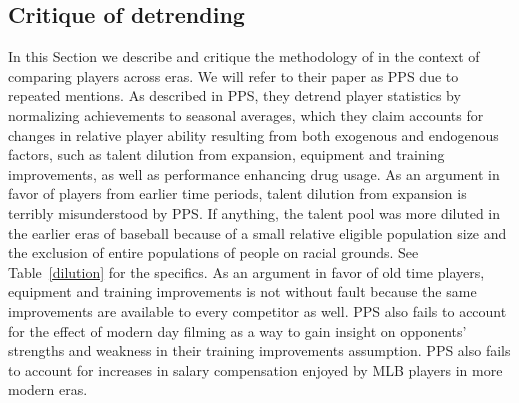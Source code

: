 \documentclass[11pt]{article}\usepackage[]{graphicx}\usepackage[]{color}
\begin{document}


\subsection{Critique of detrending}
In this Section we describe and critique the methodology of \citet{petersen} 
in the context of comparing players across eras.  We will refer to their 
paper as PPS due to repeated mentions.  
As described in PPS, they detrend player statistics by normalizing 
achievements to seasonal averages, which they claim accounts for changes in 
relative player ability resulting from both exogenous and endogenous factors, 
such as 
talent dilution from expansion, 
equipment and training improvements, 
as well as performance enhancing drug usage. 
As an argument in favor of players from earlier time periods, 
talent dilution from expansion is terribly misunderstood by PPS.  
If anything, the talent pool was more diluted in the earlier eras of 
baseball because of a small relative eligible population size and the 
exclusion of entire populations of people on racial grounds.  
See Table~\ref{dilution} for the specifics. As an argument in favor of old 
time players, equipment and training improvements is not without fault 
because the same improvements are available to every competitor as well.  
PPS also fails to account for the effect of modern day filming as a way to 
gain insight on opponents' strengths and weakness in their training 
improvements assumption.  PPS also fails to account for increases in salary 
compensation enjoyed by MLB players in more modern eras.  
\end{document}
